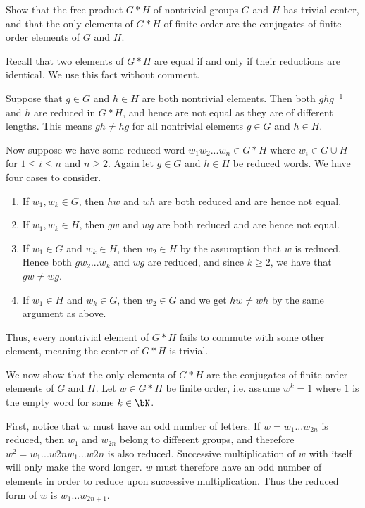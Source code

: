 \begin{homework}[e]
   Show that the free product $G \ast H$ of nontrivial groups $G$ and $H$ has trivial center, and that the only elements of $G \ast H$ of finite order are the conjugates of finite-order elements of $G$ and $H$.
  \begin{prf}
    Recall that two elements of $G\ast H$ are equal if and only if their reductions are identical. We use this fact without comment.

    Suppose that $g \in G$ and $h \in H$ are both nontrivial elements. Then both $ghg^{-1}$ and $h$ are reduced in $G\ast H$, and hence are not equal as they are of different lengths. This means $gh \neq hg$ for all nontrivial elements $g\in G$ and $h \in H$.

    Now suppose we have some reduced word $w_1w_2...w_n \in G\ast H$ where $w_i \in G \cup H$ for $1\leq i\leq n$ and $n \geq 2$. Again let $g \in G$ and $h \in H$ be reduced words. We have four cases to consider.
    \begin{enumerate}[(1)]
      \item If $w_1,w_k \in G$, then $hw$ and $wh$ are both reduced and are hence not equal.
      \item If $w_1,w_k \in H$, then $gw$ and $wg$ are both reduced and are hence not equal.
      \item If $w_1 \in G$ and $w_k \in H$, then $w_2 \in H$ by the assumption that $w$ is reduced. Hence both $gw_2...w_k$ and $wg$ are reduced, and since $k\geq 2$, we have that $gw \neq wg$.
      \item If $w_1 \in H$ and $w_k \in G$, then $w_2 \in G$ and we get $hw \neq wh$ by the same argument as above.
    \end{enumerate}
    Thus, every nontrivial element of $G\ast H$ fails to commute with some other element, meaning the center of $G\ast H$ is trivial.

    We now show that the only elements of $G*H$ are the conjugates of finite-order elements of $G$ and $H$. Let $w \in G*H$ be finite order, i.e. assume $w^k = 1$ where $1$ is the empty word for some $k \in \bN$. 
    
    First, notice that $w$ must have an odd number of letters. If $w = w_1...w_{2n}$ is reduced, then $w_1$ and $w_{2n}$ belong to different groups, and therefore $w^2 = w_1...w{2n}w_1...w{2n}$ is also reduced. Successive multiplication of $w$ with itself will only make the word longer. $w$ must therefore have an odd number of elements in order to reduce upon successive multiplication. Thus the reduced form of $w$ is $w_1...w_{2n+1}$. 
    

\end{prf}
\end{homework}
